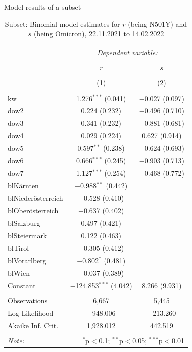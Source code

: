 \documentclass[
  ignorenonframetext,
  aspectratio=169,
]{beamer}
\begin{document}
\begin{frame}{Model results of a subset}
\protect\hypertarget{model-results-of-a-subset}{}
\begin{minipage}{.60\textwidth}

\begin{table}[!htbp] \centering 
\tiny
  \caption{Subset: Binomial model estimates for $r$ (being N501Y) and $s$ (being Omicron), 22.11.2021 to 14.02.2022} 
\begin{tabular}{@{\extracolsep{5pt}}lcc} 
\\[-1.8ex]\hline 
\hline \\[-1.8ex] 
 & \multicolumn{2}{c}{\textit{Dependent variable:}} \\ 
\cline{2-3} 
\\[-1.8ex] & $r$ & $s$ \\ 
\\[-1.8ex] & (1) & (2)\\ 
\hline \\[-1.8ex] 
 kw & 1.276$^{***}$ (0.041) & $-$0.027 (0.097) \\ 
  dow2 & 0.224 (0.232) & $-$0.496 (0.710) \\ 
  dow3 & 0.341 (0.232) & $-$0.881 (0.681) \\ 
  dow4 & 0.029 (0.224) & 0.627 (0.914) \\ 
  dow5 & 0.597$^{**}$ (0.238) & $-$0.624 (0.693) \\ 
  dow6 & 0.666$^{***}$ (0.245) & $-$0.903 (0.713) \\ 
  dow7 & 1.127$^{***}$ (0.254) & $-$0.468 (0.772) \\ 
  blKärnten & $-$0.988$^{**}$ (0.442) &  \\ 
  blNiederösterreich & $-$0.528 (0.410) &  \\ 
  blOberösterreich & $-$0.637 (0.402) &  \\ 
  blSalzburg & 0.497 (0.421) &  \\ 
  blSteiermark & 0.122 (0.463) &  \\ 
  blTirol & $-$0.305 (0.412) &  \\ 
  blVorarlberg & $-$0.802$^{*}$ (0.481) &  \\ 
  blWien & $-$0.037 (0.389) &  \\ 
  Constant & $-$124.853$^{***}$ (4.042) & 8.266 (9.931) \\ 
 \hline \\[-1.8ex] 
Observations & 6,667 & 5,445 \\ 
Log Likelihood & $-$948.006 & $-$213.260 \\ 
Akaike Inf. Crit. & 1,928.012 & 442.519 \\ 
\hline 
\hline \\[-1.8ex] 
\textit{Note:}  & \multicolumn{2}{r}{$^{*}$p$<$0.1; $^{**}$p$<$0.05; $^{***}$p$<$0.01} \\ 
\end{tabular} 
\end{table}


\end{minipage}
\end{frame}
\end{document}

